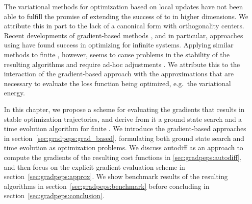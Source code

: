 The variational methods for  optimization based on local updates have not been able to fulfill the promise of extending the success of  to  in higher dimensions.
%
We attribute this in part to the lack of a canonical form with orthogonality centers.
%
Recent developments of gradient-based methods \cite{vanderstraeten2016, liao2019, hasik2019, hasik2021}, and in particular, approaches using  have found success in optimizing  for infinite systems.
%
Applying similar methods to finite , however, seems to cause problems in the stability of the resulting algorithms and require ad-hoc adjustments \cite{liu2017, scheb2023}.
%
We attribute this to the interaction of the gradient-based approach with the approximations that are necessary to evaluate the loss function being optimized, e.g.~the variational energy.



In this chapter, we propose a scheme for evaluating the gradients that results in stable optimization trajectories, and derive from it a ground state search and a time evolution algorithm for finite .
%
We introduce the gradient-based approaches in section~\ref{sec:gradpeps:grad_based}, formulating both ground state search and time evolution as optimization problems.
%
We discuss \acrfull{autodiff} as an approach to compute the gradients of the resulting cost functions in \ref{sec:gradpeps:autodiff}, and then focus on the explicit gradient evaluation scheme in section~\ref{sec:gradpeps:approx}.
%
We show benchmark results of the resulting algorithms in section~\ref{sec:gradpeps:benchmark} before concluding in section~\ref{sec:gradpeps:conclusion}.
